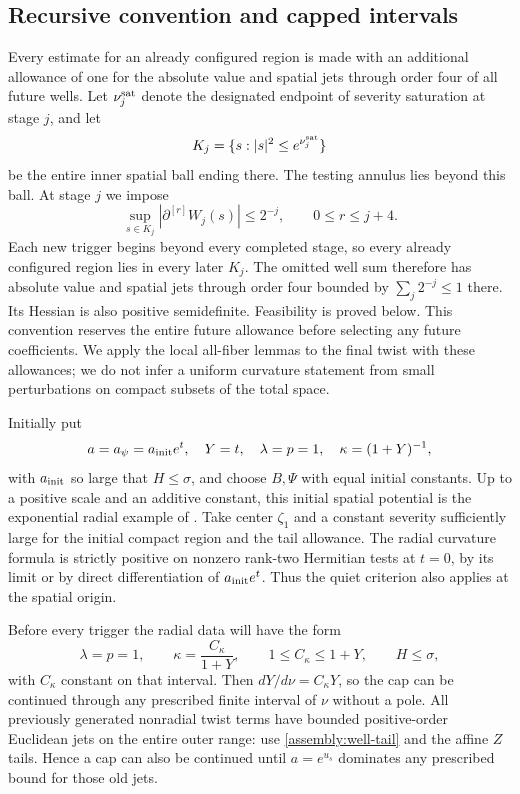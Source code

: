 \subsection{Recursive convention and capped intervals}

Every estimate for an already configured region is made with an
additional allowance of one for the absolute value and spatial
jets through order four of all future wells. Let $\nu_j^{\rm sat}$
denote the designated endpoint of severity saturation at stage $j$,
and let
\[
 K_j=\{s:|s|^2\leq e^{\nu_j^{\rm sat}}\}
\]
be the entire inner spatial ball ending there. The testing annulus lies
beyond this ball. At stage $j$ we impose
\begin{equation}\label{assembly:diagonal}
 \sup_{s\in K_j}|\partial^{[r]}W_j(s)|\leq2^{-j},
 \qquad 0\leq r\leq j+4.
\end{equation}
Each new trigger begins beyond every completed stage, so every already
configured region lies in every later $K_j$. The omitted well sum
therefore has absolute value and spatial jets through order four
bounded by $\sum_j2^{-j}\leq1$ there. Its Hessian is also positive
semidefinite. Feasibility is proved below. This convention reserves the
entire future allowance before selecting any future coefficients. We apply
the local all-fiber lemmas to the final twist with these allowances;
we do not infer a uniform curvature statement from small perturbations
on compact subsets of the total space.

Initially put
\begin{equation}\label{assembly:initial-data}
 a=a_\psi=a_{\rm init}e^t,\quad Y=t,\quad
 \lambda=p=1,\quad\kappa=(1+Y)^{-1},
\end{equation}
with $a_{\rm init}$ so large that $H\leq\sigma$, and choose $B,\Psi$
with equal initial constants. Up to a positive scale and an additive
constant, this initial spatial potential is the exponential radial
example of \citet[Section~3]{Seshadri2006}. Take center $\zeta_1$ and a constant
severity sufficiently large for the initial compact region and the
tail allowance. The radial curvature formula is strictly positive
on nonzero rank-two Hermitian tests at $t=0$, by its limit or by
direct differentiation of $a_{\rm init}e^t$. Thus the quiet criterion
also applies at the spatial origin.

Before every trigger the radial data will have the form
\begin{equation}\label{assembly:cap}
 \lambda=p=1,\qquad
 \kappa=\frac{C_\kappa}{1+Y},\qquad
 1\leq C_\kappa\leq1+Y,\qquad H\leq\sigma,
\end{equation}
with $C_\kappa$ constant on that interval. Then
$dY/d\nu=C_\kappa Y$, so the cap can be continued through any
prescribed finite interval of $\nu$ without a pole. All previously
generated nonradial twist terms have bounded positive-order Euclidean
jets on the entire outer range: use \eqref{assembly:well-tail} and
the affine $Z$ tails. Hence a cap can also be continued until
$a=e^{u_s}$ dominates any prescribed bound for those old jets.

